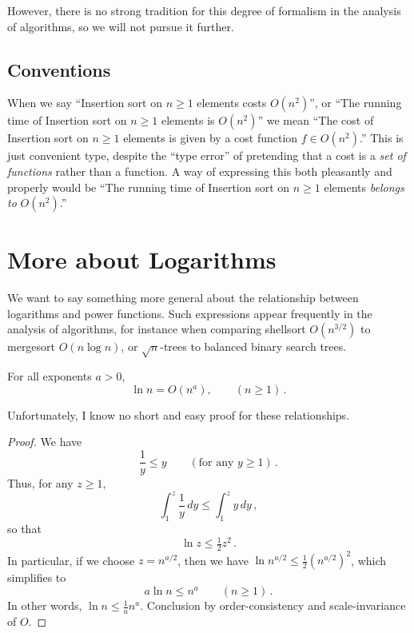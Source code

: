 \documentclass{tstextbook}
\begin{document}
However, there is no strong tradition for this degree of formalism in the analysis of algorithms, so we will not pursue it further.

\subsection{Conventions}

\begin{example}[Placeholder]
  When we say ``Insertion sort on $n\geq 1$ elements costs $O(n^2)$'', or ``The running time of Insertion sort on $n\geq 1$ elements is $O(n^2)$''  we mean ``The cost of Insertion sort on $n\geq 1$ elements is given by a cost function $f\in O(n^2)$.''
  This is just convenient type, despite the ``type error'' of pretending that a cost is a \emph{set of functions} rather than a function.
  A way of expressing this both pleasantly and properly would be ``The running time of Insertion sort on $n\geq 1$ elements \emph{belongs to} $O(n^2)$.''
\end{example}


\section{More about Logarithms}

We want to say something more general about the relationship between logarithms and power functions.
Such expressions appear frequently in the analysis of algorithms, for instance when comparing shellsort \(O(n^{3/2})\) to mergesort \(O(n\log n)\), or \(\sqrt{n}\)-trees to balanced binary search trees.


\begin{theorem}
  For all exponents \(a>0\), \[ \ln n = O(n^a), \qquad(n\geq 1)\,.\]
\end{theorem}

Unfortunately, I know no short and easy proof for these relationships.

\begin{proof}
We have
\[
\frac{1}{y} \leq y \qquad(\text{for any } y \geq 1)\,.
\]
Thus, for any \(z\geq 1\),
\[
\int_1^z \frac{1}{y} \,dy\leq  \int_1^z y\, dy \,,
\]
so that \[ \ln z \leq \tfrac{1}{2} z^2\,.\]
In particular, if we choose \(z = n^{a/2}\),
then we have \( \ln n^{a/2} \leq \frac{1}{2} (n^{a/2})^2\), which simplifies to
\[  a\ln n \leq    n^a\qquad(n\geq 1)\,. \]
  In other words, $\ln n \leq \frac1a n^a$.
  Conclusion by order-consistency and scale-invariance of $O$.
\end{proof}
\end{document}
